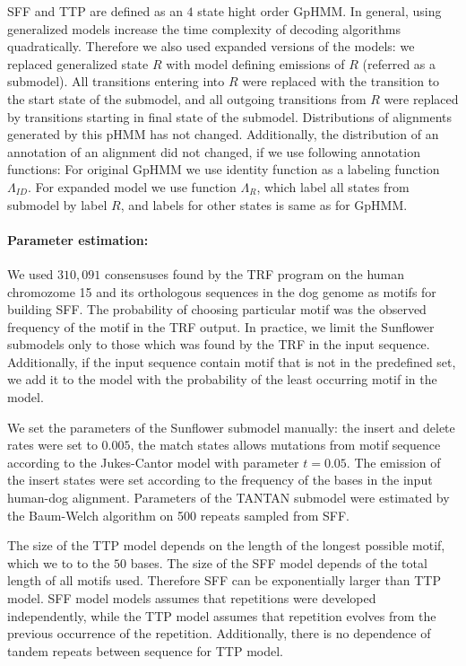 SFF and TTP are defined as an $4$ state hight order GpHMM.  In general, using
generalized models increase the time complexity of decoding algorithms
quadratically. Therefore we also used expanded versions of the models: we
replaced generalized state $R$ with model defining emissions of $R$ (referred
as a submodel). All transitions entering into $R$ were replaced with the
transition to the start state of the submodel, and all outgoing transitions
from $R$ were replaced by transitions starting in final state of the submodel.
Distributions of alignments generated by this pHMM has not changed.
Additionally, the distribution of an annotation of an alignment did not
changed, if we use following annotation functions: For original GpHMM we use
identity function as a labeling function $\Lambda_{ID}$. For expanded model we
use function $\Lambda_R$, which label all states from submodel by label $R$,
and labels for other states is same as for GpHMM. 

\paragraph{Parameter estimation:}
We used $310,091$ consensuses found by the TRF program on the human chromozome
15 and its orthologous sequences in the dog genome as motifs for building SFF.
The probability of choosing particular motif was the observed frequency of the
motif in the TRF output. In practice, we limit the Sunflower submodels only to
those which was found by the TRF in the input sequence.  Additionally, if the
input sequence contain motif that is not in the predefined set, we add it to
the model with the probability of the least occurring motif in the model.

We set the parameters of the Sunflower submodel manually: the insert and delete
rates were set to $0.005$, the match states allows mutations from motif
sequence according to the Jukes-Cantor model with parameter $t=0.05$. The
emission of the insert states were set according to the frequency of the bases
in the input human-dog alignment.  Parameters of the TANTAN submodel were
estimated by the Baum-Welch algorithm \cite{Durbin1998} on 500 repeats sampled
from SFF.

The size of the TTP model depends on the length of the longest possible motif,
which we to to the $50$ bases. The size of the SFF model depends of the total
length of all motifs used. Therefore SFF can be exponentially larger than TTP
model. SFF model models assumes that repetitions were developed independently,
while the TTP model assumes that repetition evolves from the previous
occurrence of the repetition. Additionally, there is no dependence of tandem
repeats between sequence for TTP model.

